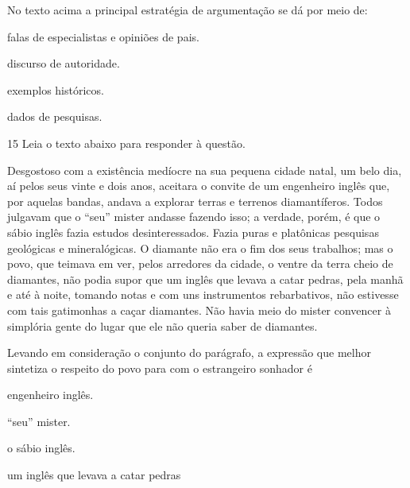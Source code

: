 
No texto acima a principal estratégia de argumentação se dá por meio de:

\begin{escolha}

    \item falas de especialistas e opiniões de pais.

    \item discurso de autoridade.

    \item exemplos históricos.

    \item dados de pesquisas.

\end{escolha}

\pagebreak

\num{15} Leia o texto abaixo para responder à questão. 


\begin{myquote}

Desgostoso com a existência medíocre na sua pequena cidade natal, 
um belo dia, aí pelos seus vinte e dois anos, aceitara o convite de um
engenheiro inglês que, por aquelas bandas, andava a explorar
terras e terrenos diamantíferos. Todos julgavam que o ``seu'' mister 
andasse fazendo isso; a verdade, porém, é que o sábio inglês fazia estudos
desinteressados. Fazia puras e platônicas pesquisas geológicas e mineralógicas.
O diamante não era o fim dos seus trabalhos; mas o povo, que teimava em ver,
pelos arredores da cidade, o ventre da terra cheio de diamantes, não podia 
supor que um inglês que levava a catar pedras, pela manhã e até à noite,
tomando notas e com uns instrumentos rebarbativos, não estivesse com tais 
gatimonhas a caçar diamantes. Não havia meio do mister convencer à simplória 
gente do lugar que ele não queria saber de diamantes. 

\end{myquote}


Levando em consideração o conjunto do parágrafo, a expressão que melhor 
sintetiza o respeito do povo para com o estrangeiro sonhador é

\begin{escolha}

    \item engenheiro inglês.

    \item ``seu'' mister.

    \item o sábio inglês. 

    \item um inglês que levava a catar pedras

\end{escolha}
